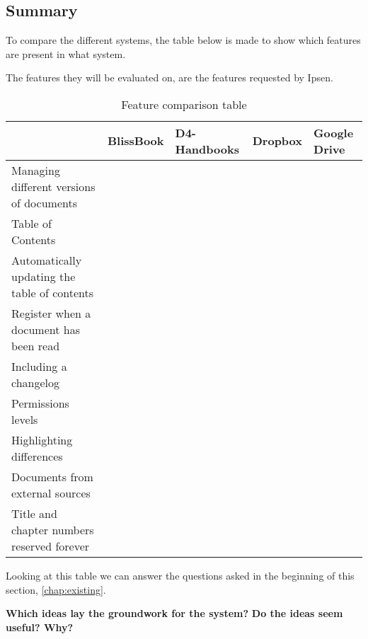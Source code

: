 \subsection{Summary}
To compare the different systems, the table below is made to show which features are present in what system.

The features they will be evaluated on, are the features requested by Ipsen.

\begin{table}[H]
	\begin{center}
		\begin{tabular}{| m{5cm}|m{1.6cm}|m{2cm}|m{1.5cm}|m{1.2cm}|}
			\hline
			& BlissBook  & D4-Handbooks & Dropbox & Google \newline Drive \\
			\hline
			Managing different versions of documents & \checkmark &  &  & \checkmark \\
			\hline
			Table of Contents & \checkmark & \checkmark  & & \\
			\hline
			Automatically updating the table of contents & \checkmark & \checkmark  &  & \\
			\hline
			Register when a document has been read & \checkmark & \checkmark &  & \\
			\hline
			Including a changelog & \checkmark & \checkmark  &  & \\
			\hline
			Permissions levels & \checkmark &  & \checkmark & \checkmark \\
			\hline
			Highlighting differences & \checkmark &  &  & \checkmark\\
			\hline
			Documents from external \newline sources &  &  & \checkmark & \checkmark \\
			\hline
			Title and chapter numbers \newline reserved forever &  &  &  & \\
			\hline
		\end{tabular}
		\caption{Feature comparison table}\label{tab:Exsisting}
	\end{center}
\end{table}

Looking at this table we can answer the questions asked in the beginning of this section, \cref{chap:existing}.

\textbf{Which ideas lay the groundwork for the system?}
\newline\indent
\textbf{Do the ideas seem useful? Why?}

